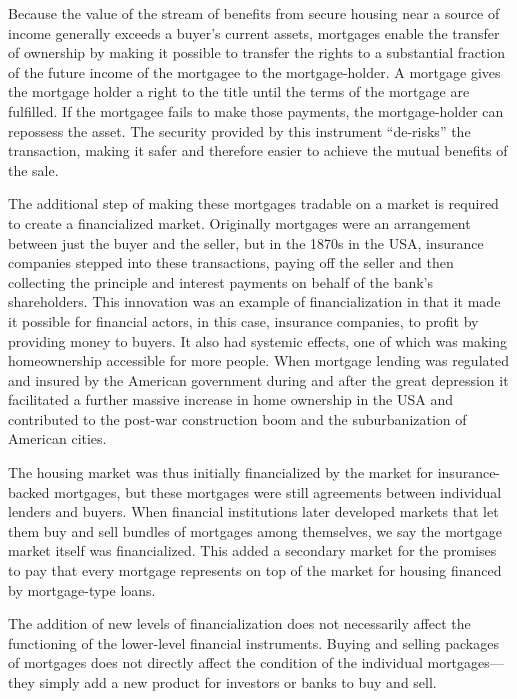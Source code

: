 Because the value of the stream of benefits from secure housing near a source of income generally exceeds a buyer's current assets, mortgages enable the transfer of ownership by making it possible to transfer the rights to a substantial fraction of the future income of the mortgagee to the mortgage-holder. A mortgage gives the mortgage holder a right to the title until the terms of the mortgage are fulfilled.  If the mortgagee fails to make those payments, the mortgage-holder can repossess the asset. The security provided by this instrument ``de-risks'' the transaction, making it safer and therefore easier to achieve the mutual benefits of the sale. 

The additional step of making these mortgages tradable on a market is required to create a financialized market. Originally mortgages were an arrangement between just the buyer and the seller, but in the 1870s in the USA, insurance companies stepped into these transactions, paying off the seller and then collecting the principle and interest payments on behalf of the bank's shareholders. This innovation was an example of financialization in that it made it possible for financial actors, in this case,  insurance companies, to profit by providing money to buyers. It also had systemic effects, one of which was making homeownership accessible for more people. When mortgage lending was regulated and insured  by the American government during and after the great depression it facilitated a further massive increase in home ownership in the USA and contributed to the post-war construction boom and the suburbanization of American cities. 

The housing market was thus initially financialized by the market for insurance-backed mortgages, but these mortgages were still agreements between individual lenders and buyers. When financial institutions later developed markets that let them buy and sell bundles of mortgages among themselves, we say the mortgage market itself was financialized. This added %
a secondary market for the promises to pay that every mortgage represents on top of the market for housing financed by mortgage-type loans.
%

The addition of new levels of financialization does not necessarily affect the functioning of the lower-level financial instruments. Buying and selling packages of mortgages does not directly affect the condition of the individual mortgages---they simply add a new product for investors or banks to buy and sell. 

